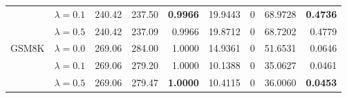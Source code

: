 \begin{table}[t]
{\begin{tabular}{l l rrrrrrr}
 & $\lambda{=}0.1$ & 240.42 & 237.50 & \textbf{0.9966} & 19.9443 & \cellcolor{cyan!12} $0$ & 68.9728 & \textbf{0.4736} \\
 & $\lambda{=}0.5$ & 240.42 & 237.09 & 0.9966 & 19.8712 & \cellcolor{cyan!12} $0$ & 68.7202 & 0.4779 \\
\midrule
GSM8K & $\lambda{=}0.0$ & 269.06 & 284.00 & 1.0000 & 14.9361 & \cellcolor{cyan!12} $0$ & 51.6531 & 0.0646 \\
 & $\lambda{=}0.1$ & 269.06 & 279.20 & 1.0000 & 10.1388 & \cellcolor{cyan!12} $0$ & 35.0627 & 0.0461 \\
 & $\lambda{=}0.5$ & 269.06 & 279.47 & \textbf{1.0000} & 10.4115 & \cellcolor{cyan!12} $0$ & 36.0060 & \textbf{0.0453} \\
\bottomrule
\end{tabular}}
\end{table}